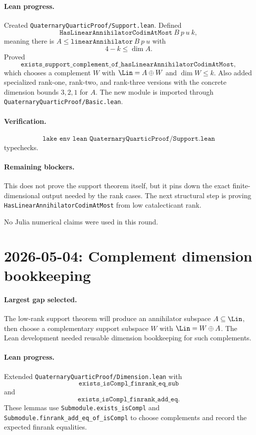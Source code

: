 \documentclass[11pt]{article}
\begin{document}
\paragraph{Lean progress.}
Created \texttt{QuaternaryQuarticProof/Support.lean}.  Defined
\[
\texttt{HasLinearAnnihilatorCodimAtMost}\ B\ p\ u\ k,
\]
meaning there is \(A\le\texttt{linearAnnihilator}\ B\ p\ u\) with
\[
4-k\le\dim A.
\]
Proved
\[
\texttt{exists\_support\_complement\_of\_hasLinearAnnihilatorCodimAtMost},
\]
which chooses a complement \(W\) with \(\Lin=A\oplus W\) and
\(\dim W\le k\).  Also added specialized rank-one, rank-two, and rank-three
versions with the concrete dimension bounds \(3,2,1\) for \(A\).
The new module is imported through \texttt{QuaternaryQuarticProof/Basic.lean}.

\paragraph{Verification.}
\[
\texttt{lake env lean QuaternaryQuarticProof/Support.lean}
\]
typechecks.

\paragraph{Remaining blockers.}
This does not prove the support theorem itself, but it pins down the exact
finite-dimensional output needed by the rank cases.  The next structural step
is proving \texttt{HasLinearAnnihilatorCodimAtMost} from low catalecticant
rank.

No Julia numerical claims were used in this round.

\section*{2026-05-04: Complement dimension bookkeeping}

\paragraph{Largest gap selected.}
The low-rank support theorem will produce an annihilator subspace
\(A\subseteq\Lin\), then choose a complementary support subspace \(W\) with
\(\Lin=W\oplus A\).  The Lean development needed reusable dimension
bookkeeping for such complements.

\paragraph{Lean progress.}
Extended \texttt{QuaternaryQuarticProof/Dimension.lean} with
\[
\texttt{exists\_isCompl\_finrank\_eq\_sub}
\]
and
\[
\texttt{exists\_isCompl\_finrank\_add\_eq}.
\]
These lemmas use \texttt{Submodule.exists\_isCompl} and
\texttt{Submodule.finrank\_add\_eq\_of\_isCompl} to choose complements and
record the expected finrank equalities.
\end{document}

